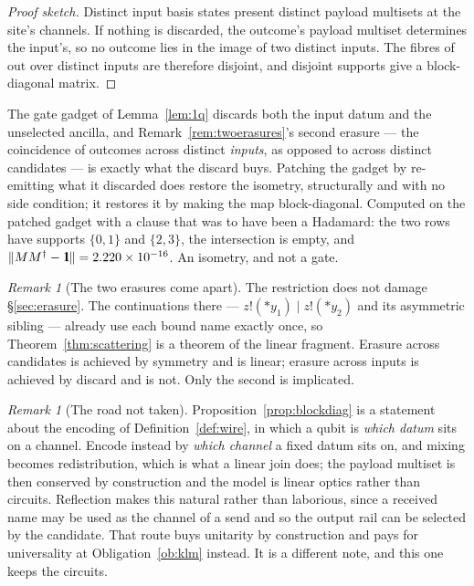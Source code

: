 \documentclass[11pt,a4paper]{article}
\newcommand{\Id}{\mathrm{1}\hspace{-0.30em}\mathrm{l}}
\theoremstyle{plain}
\theoremstyle{definition}
\theoremstyle{remark}
\newtheorem{remark}[theorem]{Remark}
\newcommand{\Out}{\mathrm{out}}
\begin{document}
\begin{proof}[Proof sketch]
Distinct input basis states present distinct payload multisets at the site's
channels. If nothing is discarded, the outcome's payload multiset determines the
input's, so no outcome lies in the image of two distinct inputs. The fibres of
$\Out$ over distinct inputs are therefore disjoint, and disjoint supports give a
block-diagonal matrix.
\end{proof}

The gate gadget of Lemma~\ref{lem:1q} discards both the input datum and the
unselected ancilla, and Remark~\ref{rem:twoerasures}'s second erasure --- the
coincidence of outcomes across distinct \emph{inputs}, as opposed to across
distinct candidates --- is exactly what the discard buys. Patching the gadget by
re-emitting what it discarded does restore the isometry, structurally and with no
side condition; it restores it by making the map block-diagonal. Computed on the
patched gadget with a clause that was to have been a Hadamard: the two rows have
supports $\{0,1\}$ and $\{2,3\}$, the intersection is empty, and
$\|MM^{\dagger}-\Id\| = 2.220\times10^{-16}$. An isometry, and not a gate.

\begin{remark}[The two erasures come apart]\label{rem:twolinear}
The restriction does not damage \S\ref{sec:erasure}. The continuations there ---
$z!(*y_1) \mid z!(*y_2)$ and its asymmetric sibling --- already use each bound
name exactly once, so Theorem~\ref{thm:scattering} is a theorem of the linear
fragment. Erasure across candidates is achieved by symmetry and is linear;
erasure across inputs is achieved by discard and is not. Only the second is
implicated.
\end{remark}

\begin{remark}[The road not taken]\label{rem:dualrail}
Proposition~\ref{prop:blockdiag} is a statement about the encoding of
Definition~\ref{def:wire}, in which a qubit is \emph{which datum} sits on a
channel. Encode instead by \emph{which channel} a fixed datum sits on, and mixing
becomes redistribution, which is what a linear join does; the payload multiset is
then conserved by construction and the model is linear optics rather than
circuits. Reflection makes this natural rather than laborious, since a received
name may be used as the channel of a send and so the output rail can be selected
by the candidate. That route buys unitarity by construction and pays for
universality at Obligation~\ref{ob:klm} instead. It is a different note, and this
one keeps the circuits.
\end{remark}
\end{document}
